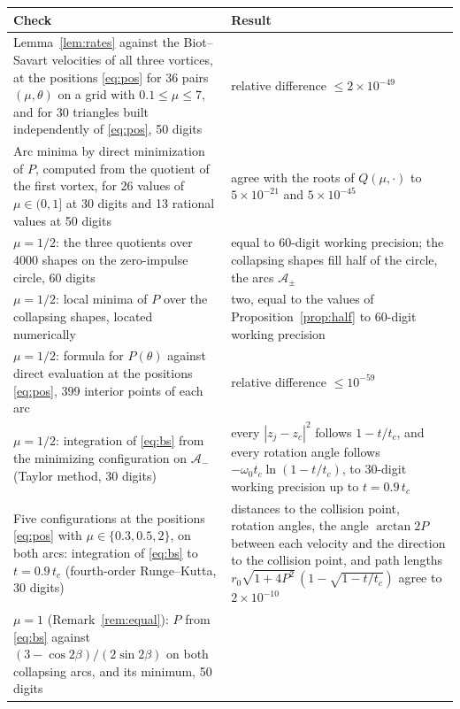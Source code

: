 \documentclass[11pt]{article}
\theoremstyle{definition}
\newcommand{\Am}{\mathcal{A}_-}
\begin{document}
\begin{table}[tp]
  \centering
  \small
  \renewcommand{\arraystretch}{1.25}
  \begin{tabular}{|>{\raggedright\arraybackslash}p{}|>{\raggedright\arraybackslash}p{}|}
    \hline
    \textbf{Check} & \textbf{Result} \\ \hline
    Lemma~\ref{lem:rates} against the Biot--Savart velocities of all three vortices, at the positions \eqref{eq:pos} for 36 pairs $(\mu, \theta)$ on a grid with $0.1 \le \mu \le 7$, and for 30 triangles built independently of \eqref{eq:pos}, 50 digits
      & relative difference $\le 2 \times 10^{-49}$ \\ \hline
    Arc minima by direct minimization of $P$, computed from the quotient of the first vortex, for 26 values of $\mu \in (0, 1]$ at 30 digits and 13 rational values at 50 digits
      & agree with the roots of $Q(\mu, \cdot)$ to $5 \times 10^{-21}$ and $5 \times 10^{-45}$ \\ \hline
    $\mu = 1/2$: the three quotients over 4000 shapes on the zero-impulse circle, 60 digits
      & equal to 60-digit working precision; the collapsing shapes fill half of the circle, the arcs $\mathcal{A}_\pm$ \\ \hline
    $\mu = 1/2$: local minima of $P$ over the collapsing shapes, located numerically
      & two, equal to the values of Proposition~\ref{prop:half} to 60-digit working precision \\ \hline
    $\mu = 1/2$: formula for $P(\theta)$ against direct evaluation at the positions \eqref{eq:pos}, 399 interior points of each arc
      & relative difference $\le 10^{-59}$ \\ \hline
    $\mu = 1/2$: integration of \eqref{eq:bs} from the minimizing configuration on $\Am$ (Taylor method, 30 digits)
      & every $|z_j - z_c|^2$ follows $1 - t/t_c$, and every rotation angle follows $-\omega_0 t_c \ln(1 - t/t_c)$, to 30-digit working precision up to $t = 0.9\, t_c$ \\ \hline
    Five configurations at the positions \eqref{eq:pos} with $\mu \in \{0.3, 0.5, 2\}$, on both arcs: integration of \eqref{eq:bs} to $t = 0.9\, t_c$ (fourth-order Runge--Kutta, 30 digits)
      & distances to the collision point, rotation angles, the angle $\arctan 2P$ between each velocity and the direction to the collision point, and path lengths $r_0 \sqrt{1 + 4P^2}\,(1 - \sqrt{1 - t/t_c})$ agree to $2 \times 10^{-10}$ \\ \hline
    $\mu = 1$ (Remark~\ref{rem:equal}): $P$ from \eqref{eq:bs} against $(3 - \cos 2\beta)/(2\sin 2\beta)$ on both collapsing arcs, and its minimum, 50 digits

\end{tabular}
\end{table}
\end{document}

